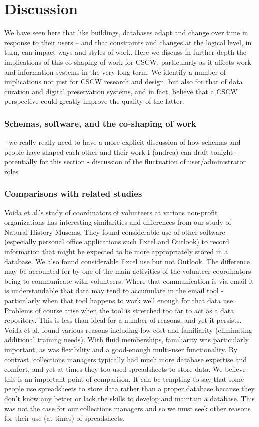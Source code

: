 \section{Discussion}

We have seen here that like buildings, databases adapt and change over time in response to their users -- and that constraints and changes at the logical level, in turn, can impact ways and styles of work.  Here we discuss in further depth the implications of this co-shaping of work for CSCW, particularly as it affects work and information systems in the very long term.  We identify a number of implications not just for CSCW research and design, but also for that of data curation and digital preservation systems, and in fact, believe that a CSCW perspective could greatly improve the quality of the latter.

\subsubsection{Schemas, software, and the co-shaping of work}

- we really really need to have a more explicit discussion of how schemas and people have shaped each other and their work I (andrea) can draft tonight
- potentially for this section - discussion of the fluctuation of user/administrator roles

\subsubsection{Comparisons with related studies}
Voida et al.'s study of coordinators of volunteers at various non-profit organizations \cite{voida2011homebrew} has interesting similarities and differences from our study of Natural History Musems. They found considerable use of other software (especially personal office applications such Excel and Outlook) to record information that might be expected to be more appropriately stored in a database. We also found considerable Excel use but not Outlook. The difference may be accounted for by one of the main activities of the volunteer coordinators being to communicate with volunteers. Where that communication is via email it is understandable that data may tend to accumulate in the email tool - particularly when that tool happens to work well enough for that data use. Problems of course arise when the tool is stretched too far to act as a data repository. This is less than ideal for a number of reasons, and yet it persists. Voida et al. found various reasons including low cost and familiarity (eliminating additional training needs). With fluid memberships, familiarity was particularly important, as was flexibility and a good-enough multi-user functionality. By contrast, collections managers typically had much more database expertise and comfort, and yet at times they too used spreadsheets to store data. We believe this is an important point of comparison. It can be tempting to say that some people use spreadsheets to store data rather than a proper database because they don't know any better or lack the skills to develop and maintain a database. This was not the case for our collections managers and so we must seek other reasons for their use (at times) of spreadsheets.

